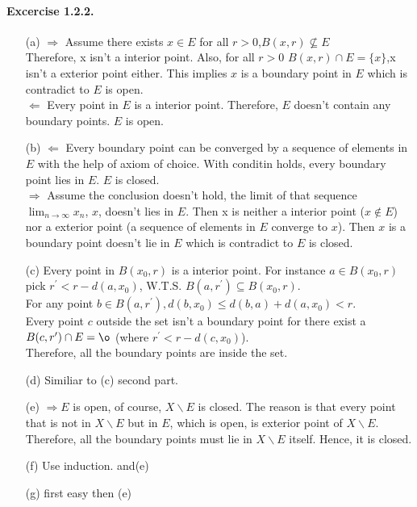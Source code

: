 \paragraph{Excercise 1.2.2.}
\begin{itemize}
\item[(a)] $\Rightarrow$ Assume there exists $x\in E$ for all $r>0$,$B(x,r)\nsubseteq E$\\
Therefore, x isn't a interior point. Also, for all $r>0$ $B(x,r)\cap E=\{x\}$,x isn't a exterior point either. This implies $x$ is a boundary point in $E$ which is contradict to $E$ is open.
\\$\Leftarrow$ Every point in $E$ is a interior point. Therefore, $E$ doesn't contain any boundary points. $E$ is open.
\item[(b)]$\Leftarrow$ Every boundary point can be converged by a sequence of elements in $E$ with the help of axiom of choice. With conditin holds, every boundary point lies in $E$. $E$ is closed.\\
$\Rightarrow$ Assume the conclusion doesn't hold, the limit of that sequence $\lim_{n\rightarrow\infty}x_{n}$, $x$, doesn't lies in $E$. Then x is neither a interior point ($x\notin E$) nor a exterior point (a sequence of elements in $E$ converge to $x$). Then $x$ is a boundary point doesn't lie in $E$ which is contradict to $E$ is closed. 
\item[(c)]Every point in $B(x_{0},r)$ is a interior point. For instance $a\in B(x_{0},r)$ pick $r^{\prime}<r - d(a,x_{0})$, W.T.S. $ B(a,r^{\prime})\subseteq B(x_{0},r)$. \\For any point $b \in B(a,r^{\prime}), d(b,x_{0})\leq d(b,a)+d(a,x_{0})<r$.\\
Every point $c$ outside the set isn't a boundary point for there exist a $B(c,r^{\prime})\cap E=\o$ (where $r^{\prime}<r-d(c,x_{0})$).\\Therefore, all the boundary points are inside the set.
\item[(d)]Similiar to (c) second part.
\item[(e)]$\Rightarrow E$ is open, of course, $X\backslash E$ is closed. The reason is that every point that is not in $X\backslash E$ but in $E$, which is open, is exterior point of $X\backslash E$. Therefore, all the boundary points must lie in $X\backslash E$ itself. Hence, it is closed.\\
\item[(f)]Use induction. and(e)
\item[(g)]first easy then (e)
\end{itemize}
